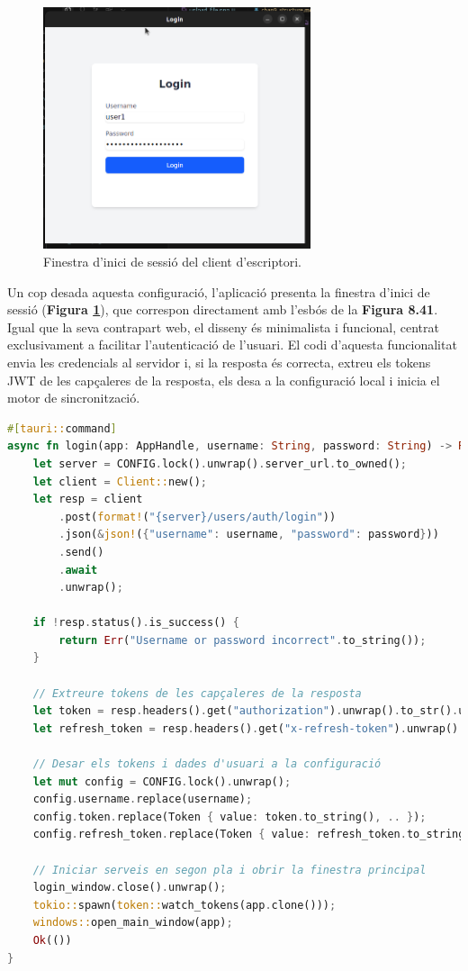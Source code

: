 \begin{figure}[H]
  \centering
  \includegraphics[width=0.7\textwidth]{Figures/ui-desktop/login.png}
  \caption{Finestra d'inici de sessió del client d'escriptori.}
  \label{fig:desktop-login-impl}
\end{figure}

Un cop desada aquesta configuració, l'aplicació presenta la finestra d'inici de sessió (\textbf{Figura \ref{fig:desktop-login-impl}}), que correspon directament amb l'esbós de la \textbf{Figura 8.41}. Igual que la seva contrapart web, el disseny és minimalista i funcional, centrat exclusivament a facilitar l'autenticació de l'usuari. El codi d'aquesta funcionalitat envia les credencials al servidor i, si la resposta és correcta, extreu els tokens JWT de les capçaleres de la resposta, els desa a la configuració local i inicia el motor de sincronització.

\begin{lstlisting}[language=Rust, caption={Comandament per a l'inici de sessió a \texttt{main.rs}}]
#[tauri::command]
async fn login(app: AppHandle, username: String, password: String) -> Result<(), String> {
    let server = CONFIG.lock().unwrap().server_url.to_owned();
    let client = Client::new();
    let resp = client
        .post(format!("{server}/users/auth/login"))
        .json(&json!({"username": username, "password": password}))
        .send()
        .await
        .unwrap();

    if !resp.status().is_success() {
        return Err("Username or password incorrect".to_string());
    }

    // Extreure tokens de les capçaleres de la resposta
    let token = resp.headers().get("authorization").unwrap().to_str().unwrap();
    let refresh_token = resp.headers().get("x-refresh-token").unwrap().to_str().unwrap();

    // Desar els tokens i dades d'usuari a la configuració
    let mut config = CONFIG.lock().unwrap();
    config.username.replace(username);
    config.token.replace(Token { value: token.to_string(), .. });
    config.refresh_token.replace(Token { value: refresh_token.to_string(), .. });
    
    // Iniciar serveis en segon pla i obrir la finestra principal
    login_window.close().unwrap();
    tokio::spawn(token::watch_tokens(app.clone()));
    windows::open_main_window(app);
    Ok(())
}
\end{lstlisting}



